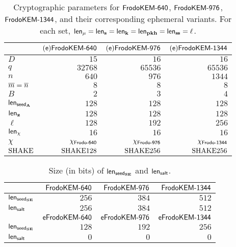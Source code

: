 \documentclass{iacrcc}
\begin{document}
\begin{table}[h]
\caption{Cryptographic parameters for $\FrodoKEMLOne$, $\FrodoKEMLThree$, $\FrodoKEMLFive$, and
their corresponding ephemeral variants.
For each set, $\lengthm = \lengths = \lengthK = \lengthpkhash = \lengthss = \ell$.}\label{tab:parameters-all}
\begin{center}
\begin{tabular}{l|r|r|r }
\toprule
& $(\styleScheme{e})\FrodoKEMLOne$ & $(\styleScheme{e})\FrodoKEMLThree$ & $(\styleScheme{e})\FrodoKEMLFive$ \\
\midrule
$D$ & $15$ & $16$ & $16$ \\
$q$ & $32768$ & $65536$ & $65536$ \\
$n$ & $640$ & $976$ & $1344$ \\
$\mbar=\nbar$ & $8$ & $8$ & $8$ \\
$B$ & $2$ & $3$ & $4$ \\
$\lengthseedA$ & $128$ & $128$ & $128$ \\
$\lengthz$ & $128$ & $128$ & $128$ \\
$\ell$ & $128$ & $192$ & $256$ \\
$\lengthchi$ & $16$ & $16$ & $16$ \\
$\chi$ & $\chi_\FrodoLOne$ & $\chi_\FrodoLThree$ & $\chi_\FrodoLFive$ \\
$\SHAKE$ & $\SHAKE128$ & $\SHAKE256$ & $\SHAKE256$ \\
\bottomrule
\end{tabular}
\end{center}
\end{table}

\begin{table}[h]
\caption{Size (in bits) of $\lengthseedSE$ and $\lengthsalt$.}\label{tab:parameters-additional}
\begin{center}
\begin{tabular}{l|r|r|r }
\toprule
& $\FrodoKEMLOne$ & $\FrodoKEMLThree$ & $\FrodoKEMLFive$ \\
\midrule
$\lengthseedSE$ & $256$ & $384$ & $512$ \\
$\lengthsalt$ & $256$ & $384$ & $512$ \\
\toprule
& $\eFrodoKEMLOne$ & $\eFrodoKEMLThree$ & $\eFrodoKEMLFive$ \\
\midrule
$\lengthseedSE$ & $128$ & $192$ & $256$ \\
$\lengthsalt$ & $0$ & $0$ & $0$ \\
\bottomrule
\end{tabular}
\end{center}
\end{table}
\end{document}

